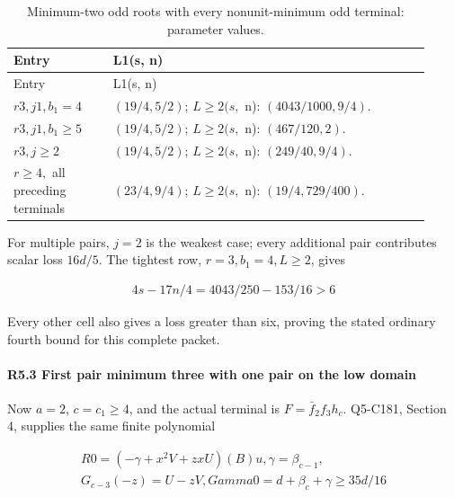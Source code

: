 \begingroup\small
\setlength{\tabcolsep}{3pt}
\setlength{\LTleft}{0pt}\setlength{\LTright}{\fill}
\begin{longtable}{@{}p{0.2200\linewidth}p{0.7000\linewidth}@{}}
\caption{Minimum-two odd roots with every nonunit-minimum odd terminal: parameter values.}\label{tab:parameters:r2-c005:2}\\
\toprule
Entry & L1(s, n) \\
\midrule\endfirsthead
\toprule
Entry & L1(s, n) \\
\midrule\endhead
\bottomrule\endfoot
\(r3,\allowbreak j1,\allowbreak b_1=4\) & \((19/4,\allowbreak 5/2)\); \(L\ge 2(s,\allowbreak \) n): \((4043/1000,\allowbreak 9/4)\). \\
\addlinespace[2pt]
\(r3,\allowbreak j1,\allowbreak b_1\ge 5\) & \((19/4,\allowbreak 5/2)\); \(L\ge 2(s,\allowbreak \) n): \((467/120,\allowbreak 2)\). \\
\addlinespace[2pt]
\(r3,\allowbreak j\ge 2\) & \((19/4,\allowbreak 5/2)\); \(L\ge 2(s,\allowbreak \) n): \((249/40,\allowbreak 9/4)\). \\
\addlinespace[2pt]
\(r\ge 4,\allowbreak \) all preceding terminals & \((23/4,\allowbreak 9/4)\); \(L\ge 2(s,\allowbreak \) n): \((19/4,\allowbreak 729/400)\). \\
\end{longtable}
\endgroup


For multiple pairs, \(j=2\) is the weakest case; every additional pair contributes scalar loss \(16d/5\). The tightest row, \(r=3,\allowbreak \allowbreak  b_1=4,\allowbreak \allowbreak  L\ge2\), gives

\[
\begin{gathered}
4s-17n/4=4043/250-153/16>6
\end{gathered}
\]

Every other cell also gives a loss greater than six, proving the stated ordinary fourth bound for this complete packet.

\paragraph{R5.3 First pair minimum three with one pair on the low domain}\label{part:R5.3}

Now \(a=2\), \(c=c_1\ge4\), and the actual terminal is \(F=\bar f_2f_3h_c\). Q5-C181, Section 4, supplies the same finite polynomial

\[
\begin{gathered}
R0=(-\gamma+x^2V+zxU)(B)u,\gamma=\beta_{c-1},\\
G_{c-3}(-z)=U-zV,Gamma0=d+\beta_c+\gamma\ge 35d/16
\end{gathered}
\]

